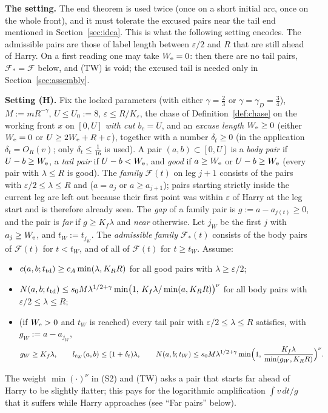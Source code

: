 \textbf{The setting.} The end theorem is used twice (once on a short initial arc, once on the whole front), and it must
tolerate the excused pairs near the tail end mentioned in Section~\ref{sec:idea}. This is what the following setting
encodes. The admissible pairs are those of label length between $\varepsilon/2$ and $R$ that are still ahead of Harry.
On a first reading one may take $W_{\mathrm{e}}=0$: then there are no tail pairs, $\mathcal F_*=\mathcal F$ below, and (TW) is
void; the excused tail is needed only in Section~\ref{sec:assembly}.

\textbf{Setting (H).}\label{set:H} Fix the locked parameters (with either $\gamma=\frac23$ or
$\gamma=\gamma_D=\frac34$), $M:=mR^{-\gamma}$, $U\le U_0:=8$, $\varepsilon\le R/K_\varepsilon$, the chase of
Definition~\ref{def:chase} on the working front $x$ on $[0,U]$ \emph{with cut $b_c=U$}, and an \emph{excuse
length} $W_{\mathrm{e}}\ge0$ (either $W_{\mathrm{e}}=0$ or $U\ge2W_{\mathrm{e}}+R+\varepsilon$), together with a number $\delta_t\ge0$ (in the application
$\delta_t=O_R(v)$; only $\delta_t\le\frac1{16}$ is used). A pair $(a,b)\subset[0,U]$ is a \emph{body pair} if
$U-b\ge W_{\mathrm{e}}$, a \emph{tail pair} if $U-b<W_{\mathrm{e}}$, and \emph{good} if $a\ge W_{\mathrm{e}}$ or $U-b\ge W_{\mathrm{e}}$ (every pair with $\lambda\le R$
is good). The \emph{family} $\mathcal F(t)$ on leg $j+1$ consists of the pairs with $\varepsilon/2\le\lambda\le R$ and
($a=a_j$ or $a\ge a_{j+1}$); pairs starting strictly inside the current leg are left out because their first point was
within $\varepsilon$ of Harry at the leg start and is therefore already seen. The \emph{gap} of a family pair is
$g:=a-a_{j(t)}\ge0$, and the pair is \emph{far} if $g\ge K_f\lambda$ and \emph{near} otherwise. Let $j_W$ be the first $j$ with $a_j\ge W_{\mathrm{e}}$, and $t_W:=t_{j_W}$. The \emph{admissible
family} $\mathcal F_*(t)$ consists of the body pairs of $\mathcal F(t)$ for $t<t_W$, and of all of $\mathcal F(t)$ for
$t\ge t_W$. Assume:
\begin{itemize}
\setlength{\itemsep}{2pt}\setlength{\parskip}{0pt}
\item[(S1)] $c(a,b;t_{\mathrm{td}})\ge c_A\min(\lambda,K_RR)$ for all good pairs with $\lambda\ge\varepsilon/2$;
\item[(S2)] $N(a,b;t_{\mathrm{td}})\le s_0M\lambda^{1/2+\gamma}\min\bigl(1,\,K_f\lambda/\min(a,K_RR)\bigr)^\nu$ for all body
pairs with $\varepsilon/2\le\lambda\le R$;
\item[(TW)] (if $W_{\mathrm{e}}>0$ and $t_W$ is reached) every tail pair with $\varepsilon/2\le\lambda\le R$ satisfies, with
$g_W:=a-a_{j_W}$,
\[
g_W\ge K_f\lambda,\qquad l_{t_W}(a,b)\le(1+\delta_t)\lambda,\qquad
N(a,b;t_W)\le s_0M\lambda^{1/2+\gamma}\min\Bigl(1,\,\frac{K_f\lambda}{\min(g_W,K_RR)}\Bigr)^\nu .
\]
\end{itemize}
The weight $\min(\cdot)^\nu$ in (S2) and (TW) asks a pair that starts far ahead of Harry to be slightly flatter; this
pays for the logarithmic amplification $\int v\,dt/g$ that it suffers while Harry approaches (see ``Far pairs'' below).

